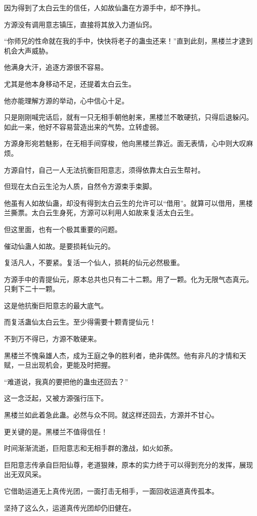 \begin{this_body}
因为得到了太白云生的信任，人如故仙蛊在方源手中，却不挣扎。

方源没有调用意志镇压，直接将其放入力道仙窍。

“你师兄的性命就在我的手中，快快将老子的蛊虫还来！”直到此刻，黑楼兰才逮到机会大声威胁。

他满身大汗，追逐方源很不容易。

尤其是他本身移动不足，还提着太白云生。

他亦能理解方源的举动，心中信心十足。

只是刚刚喊完话后，就有一只无相手朝他射来，黑楼兰不敢硬抗，只得后退躲闪。如此一来，他好不容易营造出来的气势。立转虚弱。

方源身形宛若魅影，在无相手间穿梭，他向黑楼兰靠近。面无表情，心中则大叹麻烦。

方源自忖，自己一人无法抗衡巨阳意志，须得依靠太白云生帮衬。

但现在太白云生沦为人质，自然令方源束手束脚。

他虽有人如故仙蛊，却没有得到太白云生的允许可以“借用”。就算可以借用，黑楼兰撕票。太白云生身死，方源可以利用人如故来复活太白云生。

但这里面，也有一个极其重要的问题。

催动仙蛊人如故。是要损耗仙元的。

复活凡人，不要紧。复活一个仙人，损耗的仙元必然极重。

方源手中的青提仙元，原本总共也只有二十二颗。用了一颗。化为无限气态真元。只剩下二十一颗。

这是他抗衡巨阳意志的最大底气。

而复活蛊仙太白云生。至少得需要十颗青提仙元！

不到万不得已，方源不敢硬来。

黑楼兰不愧枭雄人杰，成为王庭之争的胜利者，绝非偶然。他有非凡的才情和天赋，一旦出现机会，更能及时把握。

“难道说，我真的要把他的蛊虫还回去？”

这一念泛起，又被方源强行压下。

黑楼兰如此着急此蛊。必然与众不同。就这样还回去，方源并不甘心。

更关键的是。黑楼兰不值得信任！

时间渐渐流逝，巨阳意志和无相手群的激战，如火如荼。

巨阳意志传承自巨阳仙尊，老道狠辣，原本的实力终于可以得到充分的发挥，展现出无双风采。

它借助运道无上真传光团，一面打击无相手，一面回收运道真传孤本。

坚持了这么久，运道真传光团却仍旧健在。


\end{this_body}
